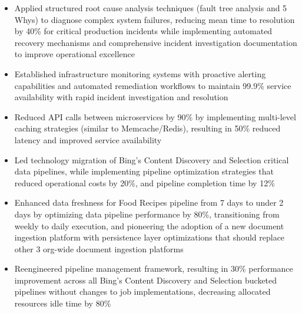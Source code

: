 \begin{itemize}
    \item \small{Applied structured root cause analysis techniques (fault tree analysis and 5 Whys) to diagnose complex \lowercase{\BackEnd} system failures, reducing mean time to resolution by 40\% for critical production incidents while implementing automated recovery mechanisms and comprehensive incident investigation documentation to improve operational excellence}

    \item \small{Established infrastructure monitoring systems with proactive alerting capabilities and automated remediation workflows to maintain 99.9\% service availability with rapid incident investigation and resolution}

    \item \small{Reduced API calls between microservices by 90\% by implementing multi-level caching strategies (similar to Memcache/Redis), resulting in 50\% reduced latency and improved \lowercase{\BackEnd} service availability}

    \item \small{Led technology migration of Bing's Content Discovery and Selection critical data pipelines, while implementing pipeline optimization strategies that reduced operational costs by 20\%, and pipeline completion time by 12\%}

    \item \small{Enhanced data freshness for Food Recipes pipeline from 7 days to under 2 days by optimizing data pipeline performance by 80\%, transitioning from weekly to daily execution, and pioneering the adoption of a new document ingestion platform with persistence layer optimizations that should replace other 3 org-wide document ingestion platforms}

    \item \small{Reengineered pipeline management framework, resulting in 30\% performance improvement across all Bing's Content Discovery and Selection bucketed pipelines without changes to job implementations, decreasing allocated resources idle time by 80\%}




\end{itemize}
